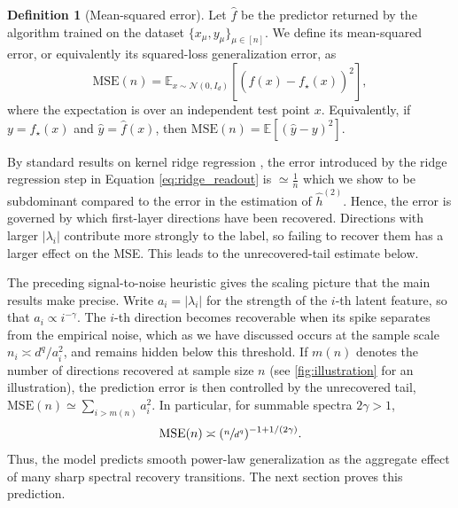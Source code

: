 \documentclass[]{article}
\numberwithin{equation}{section}
\theoremstyle{definition}
\newtheorem{definition}{Definition}[section]
\newcommand{\bl}[1]{}
\begin{document}
\begin{definition}[Mean-squared error]
Let $\widehat f$ be the predictor returned by the algorithm trained on the dataset $\{x_\mu, y_\mu\}_{\mu \in [n]}$. We define its mean-squared error, or equivalently its squared-loss generalization error, as
$$
    \mathrm{MSE}(n)
    =
    \mathbb E_{x\sim \mathcal N(0,I_d)}
    \left[
        \left(\widehat f(x)-f_\star(x)\right)^2
    \right],
$$
where the expectation is over an independent test point $x$. Equivalently, if $y=f_\star(x)$ and $\widehat y=\widehat f(x)$, then $\mathrm{MSE}(n)=\mathbb E[(\widehat y-y)^2]$.
\label{def:MSE}
\end{definition}

By standard results on kernel ridge regression \citep{caponnetto2007optimal}, the error introduced by the ridge regression step in Equation \ref{eq:ridge_readout} is $\simeq \frac{1}{n}$ which we show to be subdominant compared to the error in the estimation of $\widehat h^{(2)}$.
Hence, the error is governed by which first-layer directions have been recovered. Directions with larger $|\lambda_i|$ contribute more strongly to the label, so failing to recover them has a larger effect on the MSE. This leads to the unrecovered-tail estimate below.

The preceding signal-to-noise heuristic gives the scaling picture that the main results make precise. Write $a_i = |\lambda_i|$ for the strength of the $i$-th latent feature, so that $a_i \propto i^{-\gamma}$. The $i$-th direction becomes recoverable when its spike separates from the empirical noise, which as we have discussed occurs at the sample scale $n_i \asymp d^q/a_i^2$,
and remains hidden below this threshold. If $m(n)$ denotes the number of directions recovered at sample size $n$ (see \cref{fig:illustration} for an illustration), the prediction error is then controlled by the unrecovered tail, $\mathrm{MSE}(n) \simeq \sum_{i > m(n)} a_i^2$. In particular, for summable spectra $2\gamma > 1$,
\begin{equation}
\mathrm{MSE}(n) \asymp (\sfrac{n}{d^q})^{-1 + 1/(2\gamma)}.
\label{eq:prediction_MSE}
\end{equation}
Thus, the model predicts smooth power-law generalization as the aggregate effect of many sharp spectral recovery transitions. The next section proves this prediction.
\end{document}
